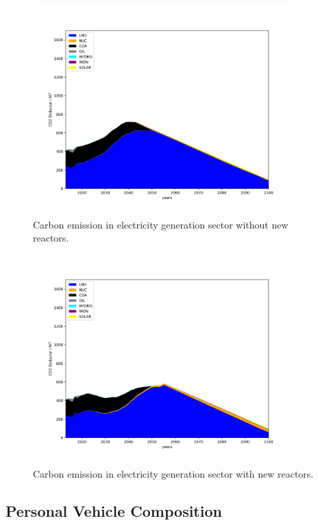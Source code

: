 \documentclass[14pt,a4paper]{article} %
\begin{document}
\begin{figure}[H]
  \centering
    \includegraphics[width=0.9\textwidth]{./plot/nonuc_co2.png}
  \caption{Carbon emission in electricity generation sector without new reactors.}
  \label{fig:nonucco2}
\end{figure}
\begin{figure}[H]
  \centering
    \includegraphics[width=0.9\textwidth]{./plot/nuc_co2.png}
  \caption{Carbon emission in electricity generation sector with new reactors.}
  \label{fig:nucco2}
\end{figure}


\subsection{Personal Vehicle Composition}
\end{document}
